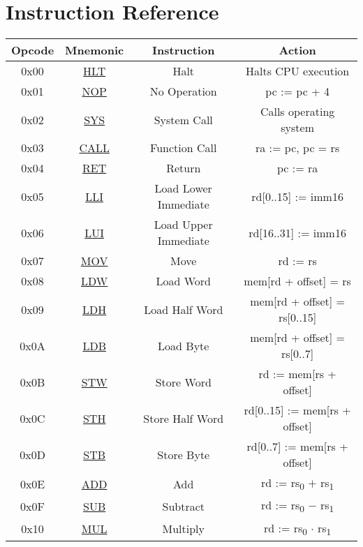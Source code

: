 \section{Instruction Reference}

\begin{center}
	\begin{tabular}{|c|c|c|c|}
		\hline
		\textbf{Opcode} & \textbf{Mnemonic} & \textbf{Instruction} & \textbf{Action}\\
		\hline
		0x00 & \hyperref[sec:HLT]{HLT} & Halt & Halts CPU execution\\
		\hline
		0x01 & \hyperref[sec:NOP]{NOP} & No Operation & pc := pc + 4\\
		\hline
		0x02 & \hyperref[sec:SYS]{SYS} & System Call & Calls operating system\\
		\hline
		0x03 & \hyperref[sec:CALL]{CALL} & Function Call & ra := pc, pc = rs\\
		\hline
		0x04 & \hyperref[sec:RET]{RET} & Return & pc := ra\\
		\hline
		0x05 & \hyperref[sec:LLI]{LLI} & Load Lower Immediate & rd[0..15] := imm16\\
		\hline
		0x06 & \hyperref[sec:LUI]{LUI} & Load Upper Immediate & rd[16..31] := imm16\\
		\hline
		0x07 & \hyperref[sec:MOV]{MOV} & Move & rd := rs\\
		\hline
		0x08 & \hyperref[sec:LDW]{LDW} & Load Word & mem[rd + offset] = rs\\
		\hline
		0x09 & \hyperref[sec:LDH]{LDH} & Load Half Word & mem[rd + offset] = rs[0..15]\\
		\hline
		0x0A & \hyperref[sec:LDB]{LDB} & Load Byte & mem[rd + offset] = rs[0..7]\\
		\hline
		0x0B & \hyperref[sec:STW]{STW} & Store Word & rd := mem[rs + offset]\\
		\hline
		0x0C & \hyperref[sec:STH]{STH} & Store Half Word & rd[0..15] := mem[rs + offset]\\
		\hline
		0x0D & \hyperref[sec:STB]{STB} & Store Byte & rd[0..7] := mem[rs + offset]\\
		\hline
		0x0E & \hyperref[sec:ADD]{ADD} & Add & rd := rs\textsubscript{0} $+$ rs\textsubscript{1}\\
		\hline
		0x0F & \hyperref[sec:SUB]{SUB} & Subtract & rd := rs\textsubscript{0} $-$ rs\textsubscript{1}\\
		\hline
		0x10 & \hyperref[sec:MUL]{MUL} & Multiply & rd := rs\textsubscript{0} $\cdot$ rs\textsubscript{1}\\

\end{tabular}
\end{center}
